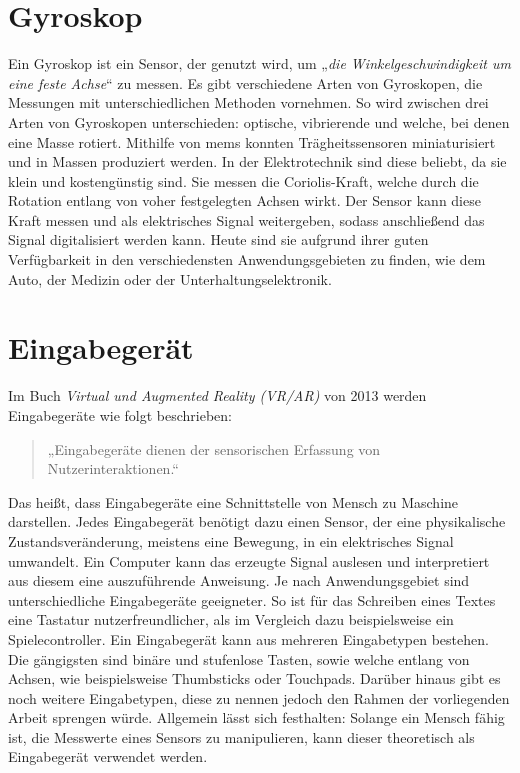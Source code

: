 \section{Gyroskop}
Ein Gyroskop ist ein Sensor, der genutzt wird, um „\textit{die Winkelgeschwindigkeit um eine feste Achse}“ zu messen\cite{armeniseAdvancesGyroscopeTechnologies2010}.
Es gibt verschiedene Arten von Gyroskopen, die Messungen mit unterschiedlichen Methoden vornehmen.
So wird zwischen drei Arten von Gyroskopen unterschieden: optische, vibrierende und welche, bei denen eine Masse rotiert.
Mithilfe von \ac{mems} konnten Trägheitssensoren miniaturisiert und in Massen produziert werden.
In der Elektrotechnik sind diese beliebt, da sie klein und kostengünstig sind\cite{maenakaMEMSInertialSensors2008}.
Sie messen die Coriolis-Kraft, welche durch die Rotation entlang von voher festgelegten Achsen wirkt.
Der Sensor kann diese Kraft messen und als elektrisches Signal weitergeben, sodass anschließend das Signal digitalisiert werden kann\cite{utmelMPU6050ModuleDatasheet}.
Heute sind sie aufgrund ihrer guten Verfügbarkeit in den verschiedensten Anwendungsgebieten zu finden, wie dem Auto, der Medizin oder der Unterhaltungselektronik\cite{armeniseAdvancesGyroscopeTechnologies2010}.

\newpage
\section{Eingabegerät}
Im Buch \textit{Virtual und Augmented Reality (VR/AR)} von 2013 werden Eingabegeräte wie folgt beschrieben:

\begin{quote}
    „Eingabegeräte dienen der sensorischen Erfassung von Nutzerinteraktionen.“\cite{doernerVirtualUndAugmented2013}
\end{quote}

Das heißt, dass Eingabegeräte eine Schnittstelle von Mensch zu Maschine darstellen.
Jedes Eingabegerät benötigt dazu einen Sensor, der eine physikalische Zustandsveränderung, meistens eine Bewegung, in ein elektrisches Signal umwandelt.
Ein Computer kann das erzeugte Signal auslesen und interpretiert aus diesem eine auszuführende Anweisung.
Je nach Anwendungsgebiet sind unterschiedliche Eingabegeräte geeigneter.
So ist für das Schreiben eines Textes eine Tastatur nutzerfreundlicher, als im Vergleich dazu beispielsweise ein Spielecontroller.
Ein Eingabegerät kann aus mehreren Eingabetypen bestehen.
Die gängigsten sind binäre und stufenlose Tasten, sowie welche entlang von Achsen, wie beispielsweise Thumbsticks oder Touchpads.
Darüber hinaus gibt es noch weitere Eingabetypen, diese zu nennen jedoch den Rahmen der vorliegenden Arbeit sprengen würde.
Allgemein lässt sich festhalten:
Solange ein Mensch fähig ist, die Messwerte eines Sensors zu manipulieren, kann dieser theoretisch als Eingabegerät verwendet werden.